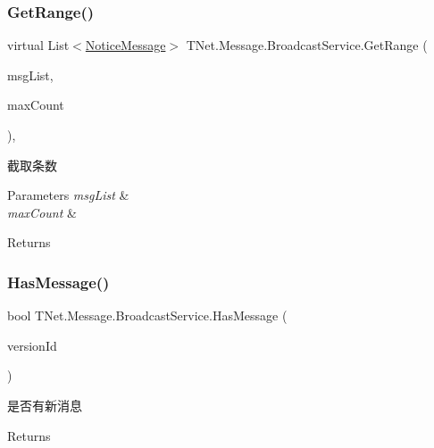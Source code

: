 \subsubsection{\texorpdfstring{Get\+Range()}{GetRange()}}
{\footnotesize\ttfamily virtual List$<$\mbox{\hyperlink{class_t_net_1_1_message_1_1_notice_message}{Notice\+Message}}$>$ T\+Net.\+Message.\+Broadcast\+Service.\+Get\+Range (\begin{DoxyParamCaption}\item[{List$<$ \mbox{\hyperlink{class_t_net_1_1_message_1_1_notice_message}{Notice\+Message}} $>$}]{msg\+List,  }\item[{int}]{max\+Count }\end{DoxyParamCaption})\hspace{0.3cm}{\ttfamily [protected]}, {\ttfamily [virtual]}}



截取条数 


\begin{DoxyParams}{Parameters}
{\em msg\+List} & \\
\hline
{\em max\+Count} & \\
\hline
\end{DoxyParams}
\begin{DoxyReturn}{Returns}

\end{DoxyReturn}
\mbox{\label{class_t_net_1_1_message_1_1_broadcast_service_ac6632327f88046a0fd4cea4e25a5c76f}} 
\subsubsection{\texorpdfstring{Has\+Message()}{HasMessage()}}
{\footnotesize\ttfamily bool T\+Net.\+Message.\+Broadcast\+Service.\+Has\+Message (\begin{DoxyParamCaption}\item[{int}]{version\+Id }\end{DoxyParamCaption})}



是否有新消息 

\begin{DoxyReturn}{Returns}

\end{DoxyReturn}
\mbox{\label{class_t_net_1_1_message_1_1_broadcast_service_a1b6f22fe5ff9d2f4c52aa9a288f3e5f5}} 
